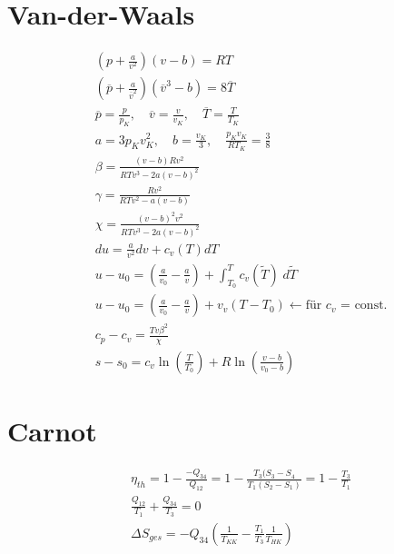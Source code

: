 \documentclass[twocolumn]{article}
\begin{document}
\section{Van-der-Waals}
\begin{align*}
	&\left(p + \frac{a}{v^2}\right)(v-b) = RT \\
	&\left(\overline{p} + \frac{a}{\overline{v}^2}\right)(\overline{v}^3-b) = 8\overline{T} \\
	&\overline{p} = \frac{p}{p_K}, \quad \overline{v} = \frac{v}{v_K}, \quad \overline{T} = \frac{T}{T_K} \\
	&a=3p_Kv^2_K, \quad b =\frac{v_K}{3}, \quad \frac{p_Kv_K}{RT_K} = \frac{3}{8} \\
	&\beta = \frac{(v-b)Rv^2}{RTv^3 - 2a(v-b)^2} \\ 
	&\gamma = \frac{Rv^2}{RTv^2 - a(v-b)} \\
	&\chi = \frac{(v-b)^2v^2}{RTv^3 - 2a(v-b)^2} \\
	& du = \frac{a}{v^2}dv + c_v(T)dT \\
	&u-u_0 = \left( \frac{a}{v_0} - \frac{a}{v} \right) + \int_{T_0}^{T} c_v(\tilde{T})\; d\tilde{T} \\
	& u - u_0 = \left(\frac{a}{v_0} - \frac{a}{v} \right) + v_v(T-T_0) \leftarrow \text{für $c_v$ = const.} \\
	&c_p - c_v = \frac{Tv\beta^2}{\chi} \\
	& s- s_0 = c_v \ln \left( \frac{T}{T_0} \right) + R \ln \left(\frac{v-b}{v_0 - b} \right)
\end{align*}

\section{Carnot}

\begin{align*}
	&\eta_{th} = 1 - \frac{-Q_{34}}{Q_{12}} = 1 - \frac{T_3(S_3-S_4}{T_1(S_2 - S_1)} = 1 - \frac{T_3}{T_1} \\
	&\frac{Q_{12}}{T_1} + \frac{Q_{34}}{T_3} = 0 \\
	&\Delta S_{ges} = -Q_{34} \left( \frac{1}{T_{KK}} - \frac{T_1}{T_3}\frac{1}{T_{HK}} \right)
\end{align*}
\end{document}

